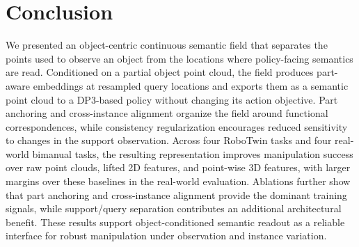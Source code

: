 \section{Conclusion}
We presented an object-centric continuous semantic field that separates the points used to observe an object from the locations where policy-facing semantics are read. Conditioned on a partial object point cloud, the field produces part-aware embeddings at resampled query locations and exports them as a semantic point cloud to a DP3-based policy without changing its action objective. Part anchoring and cross-instance alignment organize the field around functional correspondences, while consistency regularization encourages reduced sensitivity to changes in the support observation. Across four RoboTwin tasks and four real-world bimanual tasks, the resulting representation improves manipulation success over raw point clouds, lifted 2D features, and point-wise 3D features, with larger margins over these baselines in the real-world evaluation. Ablations further show that part anchoring and cross-instance alignment provide the dominant training signals, while support/query separation contributes an additional architectural benefit. These results support object-conditioned semantic readout as a reliable interface for robust manipulation under observation and instance variation.
